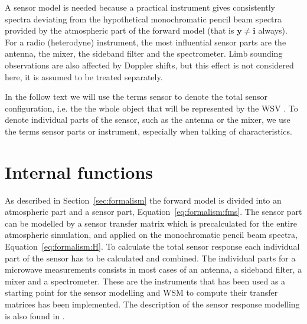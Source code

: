 %
%

A sensor model is needed because a practical instrument gives
consistently spectra deviating from the hypothetical monochromatic
pencil beam spectra provided by the atmospheric part of the forward
model (that is $\mathbf{y} \neq \mathbf{i}$ always). For a radio (heterodyne)
instrument, the most influential sensor parts are the antenna, the
mixer, the sideband filter and the spectrometer. Limb sounding
observations are also affected by Doppler shifts, but this effect is
not considered here, it is assumed to be treated separately.

In the follow text we will use the terms sensor to denote the total
sensor configuration, i.e. the the whole object that will be
represented by the WSV . To denote 
individual parts of the sensor, such as the antenna or the mixer, we
use the terms sensor parts or instrument, especially when talking
of characteristics.

\section{Internal functions}
As described in Section~\ref{sec:formalism} the forward model is
divided into an atmospheric part and a sensor part,
Equation~\ref{eq:formalism:fms}. The sensor part can be modelled by a
sensor transfer matrix which is precalculated for the entire
atmospheric simulation, and applied on the monochromatic pencil beam
spectra, Equation~\ref{eq:formalism:H}. To calculate the total sensor
response each individual part of the sensor has to be calculated and
combined.  The individual parts for a microwave measurements consists
in most cases of an antenna, a sideband filter, a mixer and a
spectrometer. These are the instruments that has been used as a
starting point for the sensor modelling and WSM to compute their
transfer matrices has been implemented. The description of the sensor
response modelling is also found in \citet{eriksson:06}.
 
